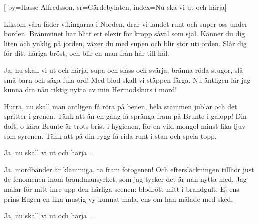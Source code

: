 [ 	
    by={Hasse Alfredsson},						
	sr={Gärdebylåten},					
	index={Nu ska vi ut och härja}]		

\beginverse*
Liksom våra fäder vikingarna i Norden,
drar vi landet runt och super oss under borden.
Brännvinet har blitt ett elexir 
för kropp såväl som själ.
Känner du dig liten och ynklig på jorden,
växer du med supen och blir stor uti orden.
Slår dig för ditt håriga bröst,
och blir en man från hår till häl.
\endverse

\beginchorus				
Ja, nu skall vi ut och härja,
supa och slåss och svärja,
bränna röda stugor, slå små barn
 och säga fula ord!
Med blod skall vi stäppen färga.
Nu äntligen lär jag
kunna dra nån riktig nytta av min Hermodskurs i mord! 
\endchorus	

\beginverse					
Hurra, nu skall man äntligen få röra på benen,
hela stammen jublar och det spritter i grenen.
Tänk att än en gång få spränga fram
 på Brunte i galopp!
Din doft, o kära Brunte är trots brist i hygienen,
för en vild mongol minst lika ljuv som syrenen.
Tänk att på din rygg få rida runt
 i stan och spela topp. 
\endverse						

\beginchorus				
Ja, nu skall vi ut och härja ...
\endchorus	

\beginverse
Ja, mordbänder är klämmiga, ta fram fotogenen!
Och eftersläckningen tillhör just de fenomenen
inom brandmansyrket, som jag tycker 
det är nån nytta med.
Jag målar för mitt inre upp den härliga scenen: 
blodrött mitt i brandgult. Ej ens prins Eugen en
lika mustig vy kunnat måla, 
ens om han målade med sked. 
\endverse	

\beginchorus	
Ja, nu skall vi ut och härja ... 
\endchorus	

\vspace{5mm}
\endsong		
